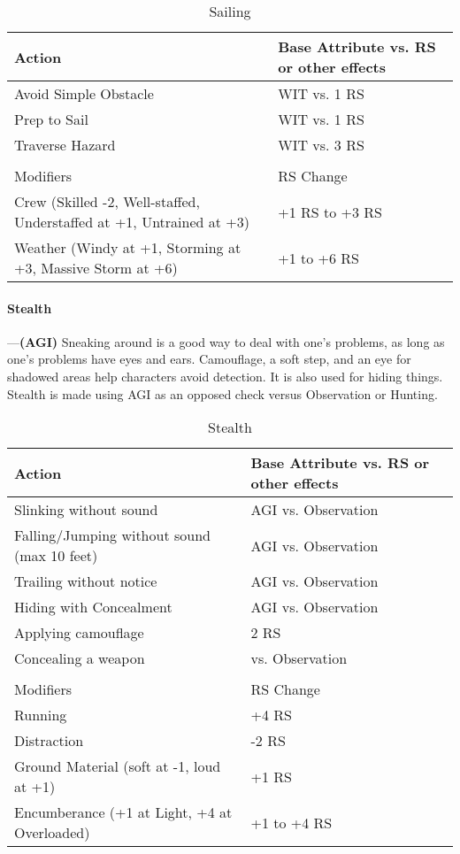 \documentclass[oneside,11pt,english]{book}
\begin{document}
\begin{longtabu} to \linewidth{X[1.5]X[r]}
	\caption{Sailing}
	\label{tab:Sailing}\\
	\rowfont[c]{}Action &Base Attribute vs. RS or other effects\\\toprule
Avoid Simple Obstacle &WIT vs. 1 RS \\
Prep to Sail &WIT vs. 1 RS \\
Traverse Hazard &WIT vs. 3 RS \\
	\\
		\rowfont[c]{}Modifiers& RS Change \\
Crew (Skilled -2, Well-staffed, Understaffed at +1, Untrained at +3) &+1 RS to +3 RS\\
Weather (Windy at +1, Storming at +3, Massive Storm at +6)&+1 to +6 RS\\
\end{longtabu}

\paragraph{\label{skill:Stealth}Stealth}---\quad\textbf{(AGI)}
Sneaking around is a good way to deal with one’s problems, as long as one’s problems have eyes and ears. Camouflage, a soft step, and an eye for shadowed areas help characters avoid detection. It is also used for hiding things. Stealth is made using AGI as an opposed check versus Observation or Hunting.

\begin{longtabu} to \linewidth{X[1.5]X[r]}
	\caption{Stealth}
	\label{tab:Stealth}\\
	\rowfont[c]{}Action &Base Attribute vs. RS or other effects\\\toprule
Slinking without sound &AGI vs. Observation \\
Falling/Jumping without sound (max 10 feet) &AGI vs. Observation \\
Trailing without notice &AGI vs. Observation \\
Hiding with Concealment &AGI vs. Observation \\
Applying camouflage &2 RS \\
Concealing a weapon &vs. Observation \\
	\\
		\rowfont[c]{}Modifiers& RS Change\\\cmidrule(lr){1-2}
Running&+4 RS \\
Distraction&-2 RS \\
Ground Material (soft at -1, loud at +1)&+1 RS \\
Encumberance (+1 at Light, +4 at Overloaded)&+1 to +4 RS\\
\end{longtabu}
\end{document}

